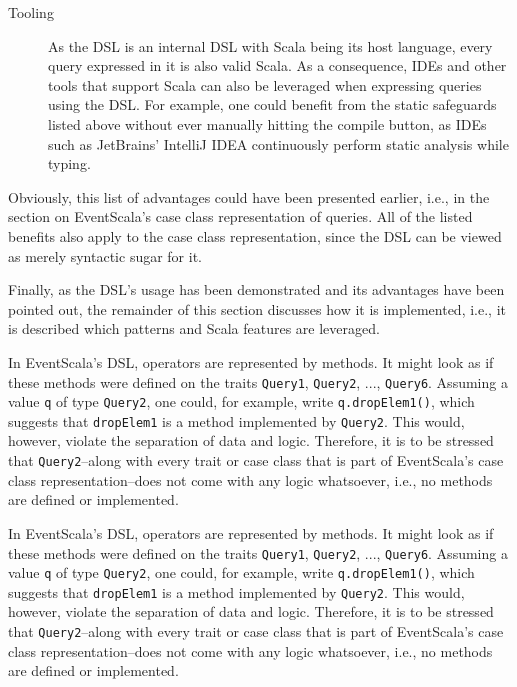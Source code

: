 \documentclass[article, type=bsc, colorback, accentcolor=tud8b, parskip=half, bibliography=totocnumbered]{tudthesis}
\begin{document}
\begin{description}
\begin{itemize}
\end{itemize}

\item[Tooling]
As the DSL is an internal DSL with Scala being its host language, every query expressed in it is also valid Scala.
As a consequence, IDEs and other tools that support Scala can also be leveraged when expressing queries using the DSL.
For example, one could benefit from the static safeguards listed above without ever manually hitting the compile button, as IDEs such as JetBrains' IntelliJ IDEA \cite{idea} continuously perform static analysis while typing.

\end{description}

Obviously, this list of advantages could have been presented earlier, i.e., in the section on EventScala's case class representation of queries.
All of the listed benefits also apply to the case class representation, since the DSL can be viewed as merely syntactic sugar for it.

Finally, as the DSL's usage has been demonstrated and its advantages have been pointed out, the remainder of this section discusses how it is implemented, i.e., it is described which patterns and Scala features are leveraged.

In EventScala's DSL, operators are represented by methods.
It might look as if these methods were defined on the traits \lstinline{Query1}, \lstinline{Query2}, ..., \lstinline{Query6}.
Assuming a value \lstinline{q} of type \lstinline{Query2}, one could, for example, write \lstinline{q.dropElem1()}, which suggests that \lstinline{dropElem1} is a method implemented by \lstinline{Query2}.
This would, however, violate the separation of data and logic.
Therefore, it is to be stressed that \lstinline{Query2}--along with every trait or case class that is part of EventScala's case class representation--does not come with any logic whatsoever, i.e., no methods are defined or implemented.

In EventScala's DSL, operators are represented by methods.
It might look as if these methods were defined on the traits \lstinline{Query1}, \lstinline{Query2}, ..., \lstinline{Query6}.
Assuming a value \lstinline{q} of type \lstinline{Query2}, one could, for example, write \lstinline{q.dropElem1()}, which suggests that \lstinline{dropElem1} is a method implemented by \lstinline{Query2}.
This would, however, violate the separation of data and logic.
Therefore, it is to be stressed that \lstinline{Query2}--along with every trait or case class that is part of EventScala's case class representation--does not come with any logic whatsoever, i.e., no methods are defined or implemented.
\end{document}
